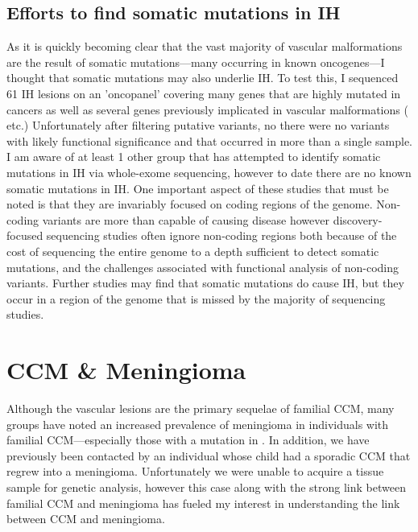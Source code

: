 \subsection{Efforts to find somatic mutations in IH}
As it is quickly becoming clear that the vast majority of vascular malformations are the result of somatic mutations---many occurring in known oncogenes---I thought that somatic mutations may also underlie IH. To test this, I sequenced 61 IH lesions on an 'oncopanel' covering many genes that are highly mutated in cancers as well as several genes previously implicated in vascular malformations ( etc.) Unfortunately after filtering putative variants, no there were no variants with likely functional significance and that occurred in more than a single sample. I am aware of at least 1 other group that has attempted to identify somatic mutations in IH via whole-exome sequencing, however to date there are no known somatic mutations in IH. One important aspect of these studies that must be noted is that they are invariably focused on coding regions of the genome. Non-coding variants are more than capable of causing disease however discovery-focused sequencing studies often ignore non-coding regions both because of the cost of sequencing the entire genome to a depth sufficient to detect somatic mutations, and the challenges associated with functional analysis of non-coding variants. Further studies may find that somatic mutations do cause IH, but they occur in a region of the genome that is missed by the majority of sequencing studies. 









\section{CCM \& Meningioma}
Although the vascular lesions are the primary sequelae of familial CCM, many groups have noted an increased prevalence of meningioma in individuals with familial CCM---especially those with a mutation in  \citep{labauge2009, riant2013, garaci2015}. In addition, we have previously been contacted by an individual whose child had a sporadic CCM that regrew into a meningioma. Unfortunately we were unable to acquire a tissue sample for genetic analysis, however this case along with the strong link between familial CCM and meningioma has fueled my interest in understanding the link between CCM and meningioma. 


